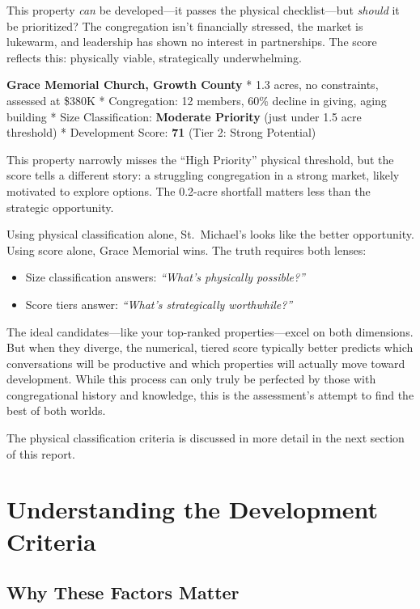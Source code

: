 \documentclass[
  letterpaper,
  DIV=11,
  numbers=noendperiod,
  oneside]{scrreprt}
\providecommand{\tightlist}{%
  \setlength{\itemsep}{0pt}\setlength{\parskip}{0pt}}
\begin{document}
This property \emph{can} be developed---it passes the physical
checklist---but \emph{should} it be prioritized? The congregation isn't
financially stressed, the market is lukewarm, and leadership has shown
no interest in partnerships. The score reflects this: physically viable,
strategically underwhelming.

\textbf{Grace Memorial Church, Growth County} * 1.3 acres, no
constraints, assessed at \$380K * Congregation: 12 members, 60\% decline
in giving, aging building * Size Classification: \textbf{Moderate
Priority} (just under 1.5 acre threshold) * Development Score:
\textbf{71} (Tier 2: Strong Potential)

This property narrowly misses the ``High Priority'' physical threshold,
but the score tells a different story: a struggling congregation in a
strong market, likely motivated to explore options. The 0.2-acre
shortfall matters less than the strategic opportunity.

Using physical classification alone, St.~Michael's looks like the better
opportunity. Using score alone, Grace Memorial wins. The truth requires
both lenses:

\begin{itemize}
\tightlist
\item
  Size classification answers: \emph{``What's physically possible?''}
\item
  Score tiers answer: \emph{``What's strategically worthwhile?''}
\end{itemize}

The ideal candidates---like your top-ranked properties---excel on both
dimensions. But when they diverge, the numerical, tiered score typically
better predicts which conversations will be productive and which
properties will actually move toward development. While this process can
only truly be perfected by those with congregational history and
knowledge, this is the assessment's attempt to find the best of both
worlds.

The physical classification criteria is discussed in more detail in the
next section of this report.

\chapter{Understanding the Development
Criteria}\label{understanding-the-development-criteria}

\section{Why These Factors Matter}\label{why-these-factors-matter}
\end{document}
